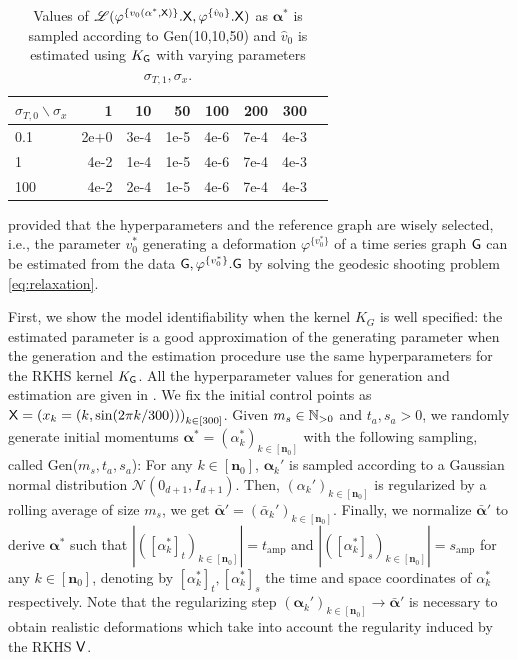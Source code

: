 \begin{table}
  \caption{Values of $\mathscr{L}(\varphi^{\{v_0(\mathbf{\alpha}^*,\mathsf{X})\}}.\mathsf{X},\varphi^{\{\hat{v}_0\}}.\mathsf{X})$ as $\mathbf{\alpha}^*$ is sampled according to Gen(10,10,50) and $\hat{v}_0$ is estimated using $K_{\mathsf{G}}$ with varying parameters $\sigma_{T,1},\sigma_x$.}
    \centering
       \begin{tabular}{lrrrrrrr}
       \toprule
       $\sigma_{T,0} \backslash \sigma_x$  & 1 & 10 & 50 & 100 & 200 & 300 \\
       \midrule
       0.1 & 2e+0 & 3e-4  & 1e-5&4e-6&7e-4&4e-3 \\
      1 & 4e-2 & 1e-4  & 1e-5&4e-6&7e-4 &4e-3  \\
       100 & 4e-2 & 2e-4  & 1e-5&4e-6&7e-4&4e-3  \\
       \bottomrule
       \end{tabular}
    \label{table:synthetic2}
    \vspace{-1em}
\end{table}

provided that the hyperparameters and the reference graph are wisely selected, i.e., the parameter $v_0^*$ generating a deformation $\varphi^{\{v_0^*\}}$ of a time series graph $\mathsf{G}$ can be estimated from the data $\mathsf{G},\varphi^{\{v_0^*\}}.\mathsf{G}$ by solving the geodesic shooting problem \eqref{eq:relaxation}. 

First, we show the model identifiability when the kernel $K_G$ is well specified: the estimated parameter is a good approximation of the generating parameter when the generation and the estimation procedure use the same hyperparameters for the RKHS kernel $K_{\mathsf{G}}$.
All the hyperparameter values for generation and estimation are given in .
We fix the initial control points as $\mathsf{X}=\left(x_k=(k,\sin(2\pi k/300))\right)_{k\in[300]} $.
Given $m_{s}\in \mathbb{N}_{>0}$ and $t_{a},s_{a}>0$, we randomly generate initial momentums $\mathbf{\alpha}^*=(\alpha_k^*)_{k\in[\mathbf{n}_0]}$ with the following sampling, called Gen($m_s,t_a,s_a$):
For any $k\in[\mathbf{n}_0]$, $\mathbf{\alpha}_k'$ is sampled according to a Gaussian normal distribution $\mathcal{N}(0_{d+1},I_{d+1})$.
Then, $(\alpha_k')_{k\in[\mathbf{n}_0]}$ is regularized by a rolling average of size $m_{s}$, we get $\bar{\mathbf{\alpha}}'=(\bar{\alpha}_k')_{k\in[\mathbf{n}_0]}$.
Finally, we normalize $\bar{\mathbf{\alpha}}'$ to derive $\mathbf{\alpha}^*$ such that $|([\alpha_k^*]_t)_{k\in[\mathbf{n}_0]}|=t_{\text{amp}}$ and $|([\alpha_k^*]_s)_{k\in[\mathbf{n}_0]}|=s_{\text{amp}}$ for any $k\in[\mathbf{n}_0]$, denoting by $[\alpha_k^*]_t,[\alpha_k^*]_s$ the time and space coordinates of $\alpha_k^*$ respectively.
Note that the regularizing step $(\mathbf{\alpha}_k')_{k\in[\mathbf{n}_0]}\to \bar{\mathbf{\alpha}}' $ is necessary to obtain realistic deformations which take into account the regularity induced by the RKHS $\mathsf{V}$.

